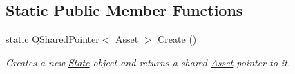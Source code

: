 \subsection*{Static Public Member Functions}
\begin{DoxyCompactItemize}
\item 
\hypertarget{class_picto_1_1_state_a8b31564710a084fd1e738e46239d497d}{static Q\-Shared\-Pointer$<$ \hyperlink{class_picto_1_1_asset}{Asset} $>$ \hyperlink{class_picto_1_1_state_a8b31564710a084fd1e738e46239d497d}{Create} ()}\label{class_picto_1_1_state_a8b31564710a084fd1e738e46239d497d}

\begin{DoxyCompactList}\small\item\em Creates a new \hyperlink{class_picto_1_1_state}{State} object and returns a shared \hyperlink{class_picto_1_1_asset}{Asset} pointer to it. \end{DoxyCompactList}\end{DoxyCompactItemize}
